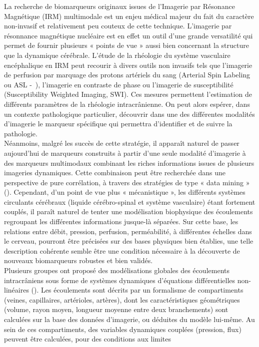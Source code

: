 		La recherche de biomarqueurs originaux issues de l’Imagerie par Résonance Magnétique (IRM) multimodale est un enjeu médical majeur du fait du caractère non-invasif et relativement peu 
couteux de cette technique. L'imagerie par résonnance magnétique nucléaire est en effet un outil d'une grande versatilité qui permet de fournir plusieurs « points de vue » aussi bien concernant 
la structure que la dynamique cérébrale. L’étude de la rhéologie du système vasculaire encéphalique en IRM peut recourir à divers outils non invasifs tels que l’imagerie de perfusion par marquage 
des protons artériels du sang (Arterial Spin Labeling ou ASL -~\cite{Alsop2014}), l’imagerie en contraste de phase ou l’imagerie de susceptibilité (Susceptibility Weighted Imaging, SWI). Ces mesures permettent 
l’estimation de différents paramètres de la rhéologie intracrânienne. On peut alors espérer, dans un contexte pathologique particulier, découvrir dans une des différentes modalités d'imagerie le 
marqueur spécifique qui permettra d'identifier et de suivre la pathologie.\\
Néanmoins, malgré les succès de cette stratégie, il apparaît naturel de passer aujourd'hui de marqueurs construits à partir d'une seule modalité d'imagerie à des marqueurs multimodaux combinant 
les riches informations issues de plusieurs imageries dynamiques. Cette combinaison peut être recherchée dans une perspective de pure corrélation, à travers des stratégies de type « data mining » (\cite{Lin2012}). 
Cependant, d'un point de vue plus « mécanistique », les différents systèmes circulants cérébraux (liquide cérébro-spinal et système vasculaire) étant fortement couplés, il paraît naturel de tenter une 
modélisation biophysique des écoulements regroupant les différentes informations jusque-là séparées. Sur cette base, les relations entre débit, pression, perfusion, perméabilité, à différentes échelles 
dans le cerveau, pourront être précisées sur des bases physiques bien établies, une telle description cohérente semble être une condition nécessaire à la découverte de nouveaux biomarqueurs robustes et 
bien validés.\\
Plusieurs groupes ont proposé des modélisations globales des écoulements intracrâniens sous forme de systèmes dynamiques d'équations différentielles non-linéaires (\cite{Sorek1988}). Les écoulements sont décrits par 
un formalisme de compartiments (veines, capillaires, artérioles, artères), dont les caractéristiques géométriques (volume, rayon moyen, longueur moyenne entre deux branchements) sont calculées sur la 
base des données d'imagerie, ou déduites du modèle lui-même. Au sein de ces compartiments, des variables dynamiques couplées (pression, flux) peuvent être calculées, pour des conditions aux limites 
